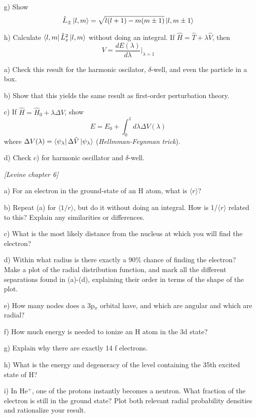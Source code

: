 g) Show
\begin{align*}
\hat{L}_{\pm}\ket{l,m} = \sqrt{l(l+1)-m(m\pm1)}\ket{l,m\pm1}
\end{align*}

h) Calculate $\bra{l,m}\hat{L}^2_x\ket{l,m}$ without doing an integral.
\newpage
{}
If $\hat{H}=\hat{T} + \lambda\hat{V}$, then
$$V = \frac{dE(\lambda)}{d\lambda}\bigg|_{\lambda=1}$$

a) Check this result for the harmonic oscilator, $\delta$-well, and
even the particle in a box.

b) Show that this yields the same result as first-order perturbation
theory.

c) If $\hat{H}=\hat{H}_0+\lambda\Delta\hat{V}$, show 
$$E = E_0 + \int^1_0 d\lambda\Delta V(\lambda)$$
where $\Delta V(\lambda) = \bra{\psi_{\lambda}}\Delta\hat{V}\ket{\psi_{\lambda}}$ ({\em Hellmman-Feynman trick}).

d) Check c) for harmonic oscillator and $\delta$-well.

\newpage
{}
{\em [Levine chapter 6]}

a) For an electron in the ground-state of an H atom, what is $\langle r \rangle$?

b) Repeat (a) for $\langle 1/r \rangle$, but do it without doing an integral.  How is 
1/$\langle r \rangle$ related to this?  Explain any similarities or differences.

c) What is the most likely distance from the nucleus at which you will find the electron?

d) Within what radius is there exactly a 90\% chance of finding the electron?
Make a plot of the radial distribution function, and mark all the different separations found in (a)-(d),
explaining their order in terms of the shape of the plot.

e) How many nodes does a 3p$_x$ orbital have, and which are angular and which are radial?

f) How much energy is needed to ionize an H atom in the 3d state?

g) Explain why there are exactly 14 f electrons.

h) What is the energy and degeneracy of the level containing the 35th excited state of H?

i) In He$^+$, one of the protons instantly becomes a neutron.  What fraction of the electron is still  in the ground state?
Plot both relevant radial probability densities and rationalize your result.

